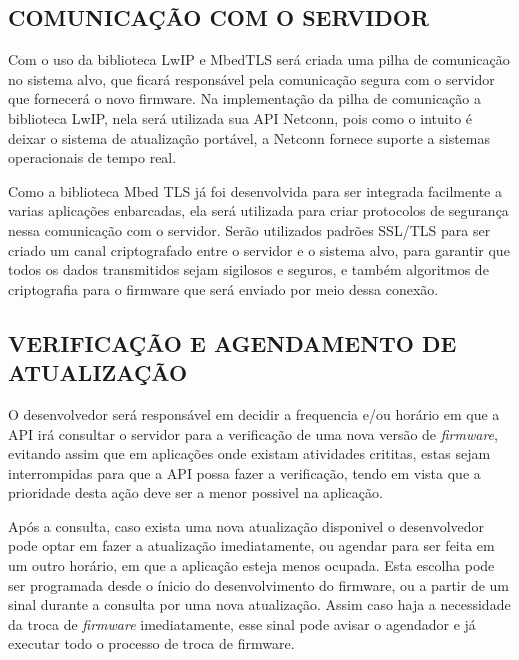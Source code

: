 \subsection{COMUNICAÇÃO COM O SERVIDOR}

Com o uso da biblioteca LwIP e MbedTLS será criada uma pilha de comunicação no sistema alvo, que ficará responsável pela comunicação segura com o servidor que fornecerá o novo firmware. Na implementação da pilha de comunicação a  biblioteca LwIP, nela será utilizada sua API Netconn, pois como o intuito é deixar o sistema de atualização portável, a Netconn fornece suporte a sistemas operacionais de tempo real.

Como a biblioteca Mbed TLS já foi desenvolvida para ser integrada facilmente a varias aplicações enbarcadas, ela será utilizada para criar protocolos de segurança nessa comunicação com o servidor. Serão utilizados padrões SSL/TLS para ser criado um canal criptografado entre o servidor e o sistema alvo, para garantir que todos os dados transmitidos sejam sigilosos e seguros, e também algoritmos de criptografia para o firmware que será enviado por meio dessa conexão.


\subsection{VERIFICAÇÃO E AGENDAMENTO DE ATUALIZAÇÃO}

O desenvolvedor será responsável em decidir a frequencia e/ou horário em que a API irá consultar o servidor para a verificação de uma nova versão de \textit{firmware}, evitando assim que em aplicações onde existam atividades crititas, estas sejam interrompidas para que a API possa fazer a verificação, tendo em vista que a prioridade desta ação deve ser a menor possivel na aplicação.

Após a consulta, caso exista uma nova atualização disponivel o desenvolvedor pode optar em fazer a atualização imediatamente, ou agendar para ser feita em um outro horário, em que a aplicação esteja menos ocupada. Esta escolha pode ser programada desde o ínicio do desenvolvimento do firmware, ou a partir de um sinal durante a consulta por uma nova atualização. Assim caso haja a necessidade da troca de \textit{firmware} imediatamente, esse sinal pode avisar o agendador e já executar todo o processo de troca de firmware. 


